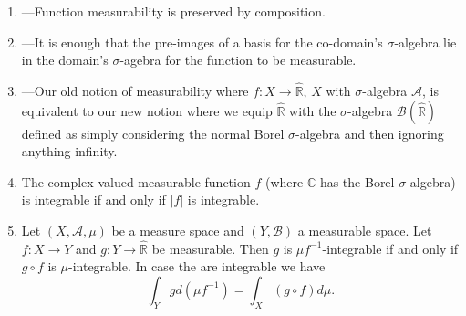 \documentclass{article}
\begin{document}
\begin{enumerate}
    \item ---Function measurability is preserved by composition.
    \item ---It is enough that the pre-images of a basis for the co-domain's $\sigma$-algebra lie in the domain's $\sigma$-agebra for the function to be measurable.
    \item ---Our old notion of measurability where $f: X \to \hat{\mathbb{R}}$, $X$ with $\sigma$-algebra $\mathscr{A}$, is equivalent to our new notion where we equip $\hat{\mathbb{R}}$ with the $\sigma$-algebra $\mathscr{B}(\hat{\mathbb{R}})$ defined as simply considering the normal Borel $\sigma$-algebra and then ignoring anything infinity.
    \item The complex valued measurable function $f$ (where $\mathbb{C}$ has the Borel $\sigma$-algebra) is integrable if and only if $|f|$ is integrable.
    \item Let $(X,\mathscr{A},\mu)$ be a measure space and $(Y,\mathscr{B})$ a measurable space. Let $f:X \to Y$ and $g:Y \to \hat{\mathbb{R}}$ be measurable. Then $g$ is $\mu f^{-1}$-integrable if and only if $g\circ f$ is $\mu$-integrable. In case the are integrable we have \[\int_Ygd(\mu f^{-1}) = \int_X (g\circ f) d\mu.\]

\end{enumerate}
\end{document}
